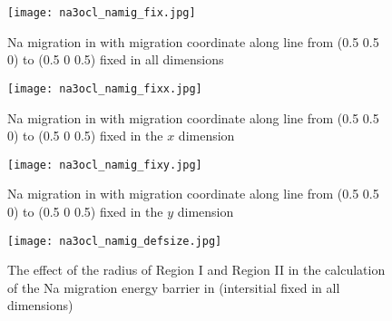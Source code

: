 \documentclass[10pt,a4paper]{article}
\begin{document}
\begin{figure}[h]
\centering
\texttt{[image: na3ocl\_namig\_fix.jpg]}
\caption{\label{na3ocl_namig_fix.jpg} Na migration in  with migration coordinate along line from (0.5 0.5 0) to (0.5 0 0.5) fixed in all dimensions}
\end{figure}

\begin{figure}[h]
\centering
\texttt{[image: na3ocl\_namig\_fixx.jpg]}
\caption{\label{na3ocl_namig_fixx.jpg} Na migration in  with migration coordinate along line from (0.5 0.5 0) to (0.5 0 0.5) fixed in the $x$ dimension}
\end{figure}

\begin{figure}[h]
\centering
\texttt{[image: na3ocl\_namig\_fixy.jpg]}
\caption{\label{na3ocl_namig_fixy.jpg} Na migration in  with migration coordinate along line from (0.5 0.5 0) to (0.5 0 0.5) fixed in the $y$ dimension}
\end{figure}

\begin{figure}[h]
\centering
\texttt{[image: na3ocl\_namig\_defsize.jpg]}
\caption{\label{na3ocl_namig_defsize.jpg} The effect of the radius of Region I and Region II in the calculation of the Na migration energy barrier in  (intersitial fixed in all dimensions)}
\end{figure}
\end{document}
